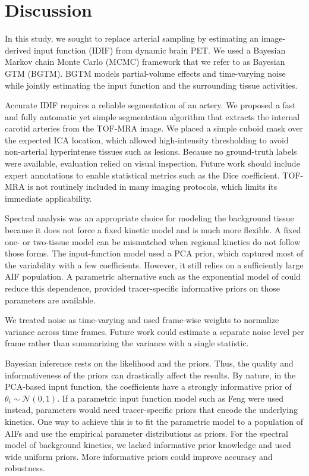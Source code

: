 \chapter{Discussion}

In this study, we sought to replace arterial sampling by estimating an image-derived input function (IDIF) from dynamic brain PET.
We used a Bayesian Markov chain Monte Carlo (MCMC) framework that we refer to as Bayesian GTM (BGTM).
BGTM models partial-volume effects and time-varying noise while jointly estimating the input function and the surrounding tissue activities.

Accurate IDIF requires a reliable segmentation of an artery.
We proposed a fast and fully automatic yet simple segmentation algorithm that extracts the internal carotid arteries from the TOF-MRA image.
We placed a simple cuboid mask over the expected ICA location, which allowed high-intensity thresholding to avoid non-arterial hyperintense tissues such as lesions. %
Because no ground-truth labels were available, evaluation relied on visual inspection. Future work should include expert annotations to enable statistical metrics such as the Dice coefficient.
TOF-MRA is not routinely included in many imaging protocols, which limits its immediate applicability. %

Spectral analysis was an appropriate choice for modeling the background tissue because it does not force a fixed kinetic model and is much more flexible.
A fixed one- or two-tissue model can be mismatched when regional kinetics do not follow those forms.
The input-function model used a PCA prior, which captured most of the variability with a few coefficients.
However, it still relies on a sufficiently large AIF population. %
A parametric alternative such as the exponential model of \citeauthor{feng1993models} \cite{feng1993models} could reduce this dependence, provided tracer-specific informative priors on those parameters are available. %

We treated noise as time-varying and used frame-wise weights to normalize variance across time frames. %
Future work could estimate a separate noise level per frame rather than summarizing the variance with a single statistic.

Bayesian inference rests on the likelihood and the priors.
Thus, the quality and informativeness of the priors can drastically affect the results. %
By nature, in the PCA-based input function, the coefficients have a strongly informative prior of \(\theta_i \sim \mathcal{N}(0,1)\). %
If a parametric input function model such as Feng were used instead, parameters would need tracer-specific priors that encode the underlying kinetics.
One way to achieve this is to fit the parametric model to a population of AIFs and use the empirical parameter distributions as priors.
For the spectral model of background kinetics, we lacked informative prior knowledge and used wide uniform priors.
More informative priors could improve accuracy and robustness.

